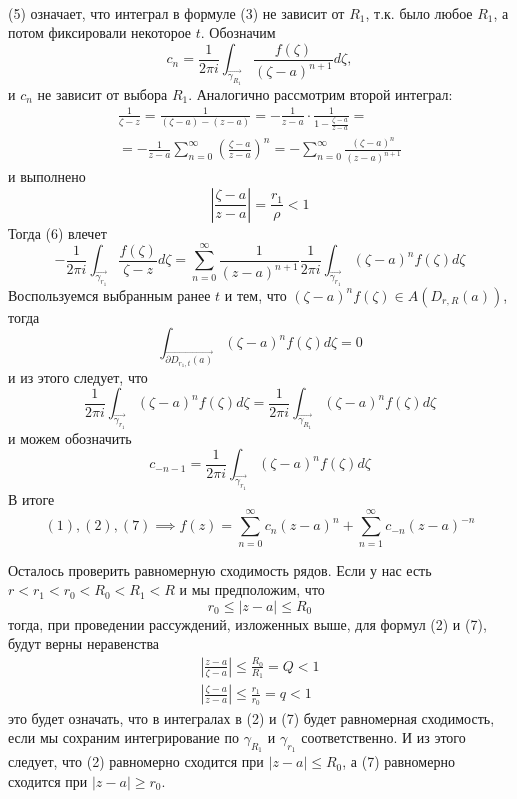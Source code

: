 \documentclass[main]{subfiles}
\begin{document}
\begin{longProof}
\begin{gather*}
    \end{gather*}
    (5) означает, что интеграл в формуле (3) не зависит от $R_1$, т.к. было любое $R_1$, а потом фиксировали некоторое $t$.
    Обозначим
    \[c_n = \frac{1}{2 \pi i}  \int_{\overrightarrow{\gamma_{R_1}}} \frac{f(\zeta)}{(\zeta -a)^{n+1}} d\zeta,\]
    и $c_n$ не зависит от выбора $R_1$.
    Аналогично рассмотрим второй интеграл:
    \begin{multline*}
        \frac{1}{\zeta - z} = \frac{1}{(\zeta - a) - (z - a)} = -\frac{1}{z - a}\cdot \frac{1}{1 - \frac{\zeta - a}{z - a}} = \\
        = -\frac{1}{z - a} \sum_{n = 0 }^{\infty} \left(\frac{\zeta - a}{z -a}\right)^n = - \sum_{n = 0 }^{\infty} \frac{(\zeta- a)^n}{(z -a)^{n+1}} \tag{6}
    \end{multline*}
    и выполнено
    \[\left| \frac{\zeta - a}{z - a} \right| = \frac{r_1}{\rho} < 1\]
    Тогда (6) влечет
    \[- \frac{1}{2 \pi i } \int_{\overrightarrow{\gamma_{r_1}}} \frac{f(\zeta)}{\zeta - z} d\zeta  = \sum_{n = 0 }^{\infty} \frac{1}{(z-a)^{n+1}} \frac{1}{2 \pi i} \int_{\overrightarrow{\gamma_{r_1}}} (\zeta - a)^n f(\zeta) d\zeta \tag{7} \]
    Воспользуемся выбранным ранее $t$ и тем, что $(\zeta - a)^n f(\zeta) \in A(D_{r, R}(a))$, тогда
    \[\int_{\overrightarrow{\partial D_{r_1, t} (a)}}  (\zeta - a)^n f(\zeta) d\zeta = 0 \tag{8}\]
    и из этого следует, что
    \[\frac{1}{2 \pi i} \int_{\overrightarrow{\gamma_{r_1}}} (\zeta - a)^n f(\zeta) d\zeta =  \frac{1}{2 \pi i}  \int_{\overrightarrow{\gamma_{R_1}}} (\zeta - a)^n f(\zeta) d\zeta \tag{9}\]
    и можем обозначить
    \[c_{-n-1} = \frac{1}{2 \pi i} \int_{\overrightarrow{\gamma_{r_1}}} (\zeta - a)^n f(\zeta) d\zeta\]
    В итоге
    \[(1), (2), (7) \implies f(z) = \sum_{n=0}^{\infty} c_{n} (z-a)^n + \sum_{n=1}^{\infty} c_{-n} (z-a)^{-n}\]

    Осталось проверить равномерную сходимость рядов.
    Если у нас есть $r < r_1 < r_0 < R_0 < R_1 < R$ и мы предположим, что
    \[r_0 \le |z-a| \le R_0\]
    тогда, при проведении рассуждений, изложенных выше, для формул (2) и (7), будут верны неравенства
    \begin{gather*}
        \left| \frac{z-a}{\zeta - a} \right| \le \frac{R_0}{R_1} = Q < 1\\
        \left| \frac{\zeta - a}{z - a} \right| \le \frac{r_1}{r_0} = q < 1
    \end{gather*}
    это будет означать, что в интегралах в (2) и (7) будет равномерная сходимость, если мы сохраним интегрирование по $\gamma_{R_1}$ и $\gamma_{r_1}$ соответственно.
    И из этого следует, что (2) равномерно сходится при $|z - a| \le R_0$, а (7) равномерно сходится при $|z - a| \ge r_0$.
\end{longProof}
\end{document}
